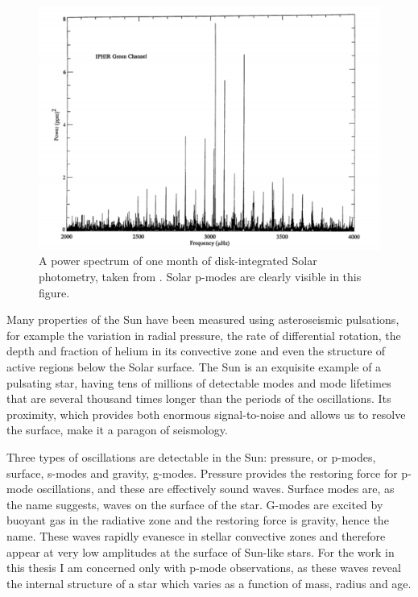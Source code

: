\begin{figure}[p]
\begin{center}
\includegraphics[width=6in, clip=true]{figures/solar_spectrum.pdf}
\caption[Solar power spectrum.]{A power spectrum of one month of
disk-integrated Solar photometry, taken from \citet{toutain}.
Solar p-modes are clearly visible in this figure.}
\label{fig:solar_spectrum}
\end{center}
\end{figure}

Many properties of the Sun have been measured using asteroseismic pulsations,
for example the variation in radial pressure, the rate of differential
rotation, the depth and fraction of helium in its convective zone and even the
structure of active regions below the Solar surface.
The Sun is an exquisite example of a pulsating star, having tens of millions
of detectable modes and mode lifetimes that are several thousand times longer
than the periods of the oscillations.
Its proximity, which provides both enormous signal-to-noise and allows us to
resolve the surface, make it a paragon of seismology.

Three types of oscillations are detectable in the Sun: pressure, or p-modes,
surface, s-modes and gravity, g-modes.
Pressure provides the restoring force for p-mode oscillations, and these are
effectively sound waves.
Surface modes are, as the name suggests, waves on the surface of the star.
G-modes are excited by buoyant gas in the radiative zone and the restoring
force is gravity, hence the name.
These waves rapidly evanesce in stellar convective zones and therefore
appear at very low amplitudes at the surface of Sun-like stars.
For the work in this thesis I am concerned only with p-mode observations, as
these waves reveal the internal structure of a star which varies as a function
of mass, radius and age.

